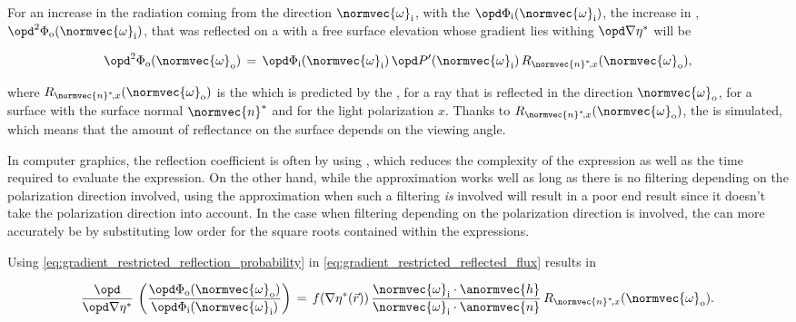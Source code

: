 For an increase in the radiation coming from the direction $\normvec{\omega}_{\text{i}}$, with the  $\opd \Phi_{\text{i}}(\normvec{\omega}_{\text{i}})$, the increase in , $\opd^2 \Phi_{\text{o}}(\normvec{\omega}_{\text{i}})$, that was reflected on a \microfacet with a free surface elevation whose gradient lies withing $\opd\nabla\eta^*$ will be

\begin{equation} \label{eq:gradient_restricted_reflected_flux}
\opd^2 \Phi_{\text{o}}(\normvec{\omega}_{\text{o}}) \,=\, \opd \Phi_{\text{i}}(\normvec{\omega}_{\text{i}})\,\opd P'(\normvec{\omega}_{\text{i}})\,R_{\normvec{n}^*\!,x}(\normvec{\omega}_{\text{o}}),
\end{equation}

where $R_{\normvec{n}^*\!,x}(\normvec{\omega}_{\text{o}})$ is the  which is predicted by the , for a ray that is reflected in the direction $\normvec{\omega}_{\text{o}}$, for a surface with the surface normal $\normvec{n}^*$ and for the light polarization $x$. Thanks to $R_{\normvec{n}^*\!,x}(\normvec{\omega}_{\text{o}})$, the  is simulated, which means that the amount of reflectance on the surface depends on the viewing angle.

In computer graphics, the reflection coefficient is often \approximated by using , which reduces the complexity of the expression as well as the time required to evaluate the expression. On the other hand, while the approximation works well as long as there is no filtering depending on the polarization direction involved, using the approximation when such a filtering \emph{is} involved will result in a poor end result since it doesn't take the polarization direction into account. In the case when filtering depending on the polarization direction is involved, the  can more accurately be \approximated by substituting low order  for the square roots contained within the expressions.

Using \eqref{eq:gradient_restricted_reflection_probability} in \eqref{eq:gradient_restricted_reflected_flux} results in

\begin{equation} \label{eq:gradient_restricted_reflected_flux_pre_incident_flux_per_unit_gradient_squared}
\frac{\opd}{\opd \nabla\eta^*}\,\left(\frac{\opd \Phi_{\text{o}}(\normvec{\omega}_{\text{o}})}{\opd \Phi_{\text{i}}(\normvec{\omega}_{\text{i}})}\right) \,=\, f(\nabla\eta^*(\vec{r}))\,\frac{\normvec{\omega}_{\text{i}}\cdot\anormvec{h}}{\normvec{\omega}_{\text{i}}\cdot\anormvec{n}}\,R_{\normvec{n}^*\!,x}(\normvec{\omega}_{\text{o}}).
\end{equation}

